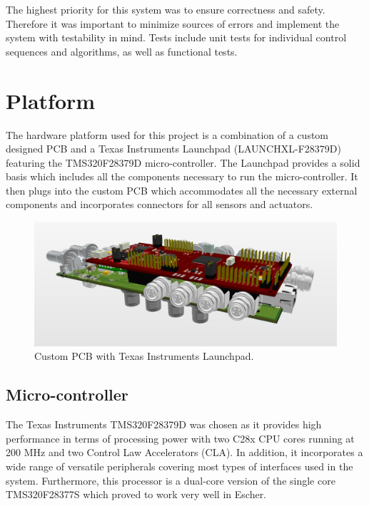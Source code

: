 The highest priority for this system was to ensure correctness and safety. Therefore it was important to minimize sources of errors and implement the system with testability in mind. Tests include unit tests for individual control sequences and algorithms, as well as functional tests.

\section{Platform}

The hardware platform used for this project is a combination of a custom designed PCB and a Texas Instruments Launchpad (LAUNCHXL-F28379D)\cite{launchpad} featuring the TMS320F28379D micro-controller\cite{mcu}. The Launchpad provides a solid basis which includes all the components necessary to run the micro-controller. It then plugs into the custom PCB which accommodates all the necessary external components and incorporates connectors for all sensors and actuators.

\begin{figure}[H]
  \centering \includegraphics[width=1.0\textwidth]{./figures/pcb.png}
  \caption{Custom PCB with Texas Instruments Launchpad.}
\end{figure}

\subsection{Micro-controller}

The Texas Instruments TMS320F28379D\cite{mcu} was chosen as it provides high performance in terms of processing power with two C28x CPU cores running at 200 MHz and two Control Law Accelerators (CLA). In addition, it incorporates a wide range of versatile peripherals covering most types of interfaces used in the system. Furthermore, this processor is a dual-core version of the single core TMS320F28377S which proved to work very well in Escher.

